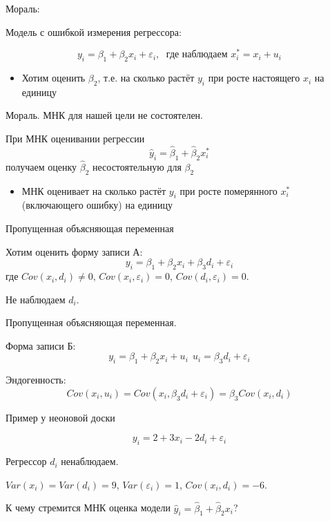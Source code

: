 \documentclass[ignorenonframetext,]{beamer}
\newcommand{\e}{\varepsilon}
\begin{document}
\begin{frame}{Мораль:}

Модель с ошибкой измерения регрессора:

\[
y_i= \beta_1 + \beta_2 x_i + \varepsilon_i, \; \text{ где наблюдаем } x_i^*=x_i+u_i
\]

\begin{itemize}
\itemsep1pt\parskip0pt
\item
  Хотим оценить \(\beta_2\), т.е. на сколько растёт \(y_i\) при росте
  настоящего \(x_i\) на единицу
\end{itemize}

\end{frame}

\begin{frame}{Мораль. МНК для нашей цели не состоятелен.}

При МНК оценивании регрессии \[
\hat{y}_i = \hat{\beta}_1 + \hat{\beta}_2 x_i^*
\] получаем оценку \(\hat{\beta}_2\) несостоятельную для \(\beta_2\)

\begin{itemize}
\itemsep1pt\parskip0pt
\item
  МНК оценивает на сколько растёт \(y_i\) при росте померянного
  \(x_i^*\) (включающего ошибку) на единицу
\end{itemize}

\end{frame}

\begin{frame}{Пропущенная объясняющая переменная}

Хотим оценить форму записи А: \[
y_i=\beta_1 + \beta_2 x_i + \beta_3 d_i + \e_i
\] где \(Cov(x_i,d_i)\neq 0\), \(Cov(x_i,\e_i)=0\), \(Cov(d_i,\e_i)=0\).

Не наблюдаем \(d_i\).

\end{frame}

\begin{frame}{Пропущенная объясняющая переменная.}

Форма записи Б: \[
y_i=\beta_1 + \beta_2 x_i + u_i\, \; u_i=\beta_3 d_i + \e_i
\]

Эндогенность: \[
Cov(x_i,u_i)=Cov(x_i,\beta_3 d_i + \e_i)=\beta_3 Cov(x_i, d_i)
\]

\end{frame}

\begin{frame}{Пример у неоновой доски}

\[
y_i= 2 + 3x_i -2d_i + \varepsilon_i
\]

Регрессор \(d_i\) ненаблюдаем.

\(Var(x_i)=Var(d_i)=9\), \(Var(\varepsilon_i)=1\), \(Cov(x_i,d_i)=-6\).

К чему стремится МНК оценка модели
\(\hat{y}_i = \hat{\beta}_1 + \hat{\beta}_2 x_i\)?

\end{frame}
\end{document}
